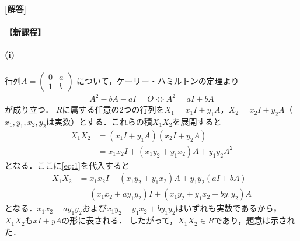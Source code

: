 \documentclass[../../main.tex]{subfiles}
\begin{document}
\begin{oframed}
  
\end{oframed}

{\bf [解答]}
\paragraph{【新課程】}
\paragraph{(i)}
行列$A =
\begin{pmatrix} 0 & a \\ 1 & b
\end{pmatrix}$
について，ケーリー・ハミルトンの定理より
\begin{align}
  A^2 - bA - aI = O \Longleftrightarrow A^2 = aI + bA
  \label{eq:1}
\end{align}
が成り立つ．
$R$に属する任意の$2$つの行列を$X_1 = x_1 I + y_1 A$，$X_2 = x_2 I + y_2 A$（$x_1, y_1, x_2, y_2$は実数）とする．これらの積$X_1 X_2$を展開すると
\begin{align}
  X_1 X_2 &= (x_1 I + y_1 A)(x_2 I + y_2 A) \nonumber\\
  &= x_1 x_2 I + (x_1 y_2 + y_1 x_2) A + y_1 y_2 A^2 \label{eq:2}
\end{align}
となる．ここに\cref{eq:1}を代入すると
\begin{align}
  X_1 X_2 &= x_1 x_2 I + (x_1 y_2 + y_1 x_2) A + y_1 y_2 (aI + bA) \nonumber\\
  &= (x_1 x_2 + a y_1 y_2) I + (x_1 y_2 + y_1 x_2 + b y_1 y_2) A
\end{align}
となる．$x_1 x_2 + a y_1 y_2$および$x_1 y_2 + y_1 x_2 + b y_1 y_2$はいずれも実数であるから，$X_1 X_2$も$xI+yA$の形に表される．
したがって，$X_1 X_2 \in R$であり，題意は示された．
\end{document}
